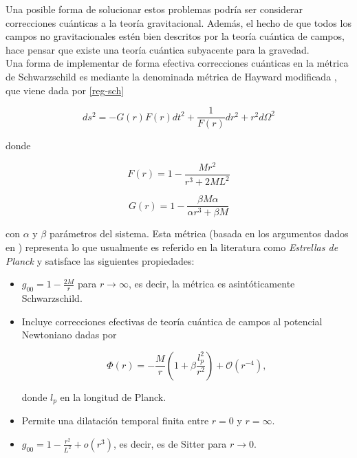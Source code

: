 \documentclass{article}
\numberwithin{equation}{section}
\begin{document}
Una posible forma de solucionar estos problemas podría ser considerar correcciones cuánticas a la teoría gravitacional. Además, el hecho de que todos los campos no gravitacionales estén bien descritos por la teoría cuántica de campos, hace pensar que existe una teoría cuántica subyacente para la gravedad.\\ 

Una forma de implementar de forma efectiva correcciones cuánticas en la métrica de Schwarzschild es mediante la denominada métrica de Hayward modificada \cite{hayward,lorenzo}, que viene dada por \eqref{reg-sch} 

\begin{equation}
\label{reg-sch}
ds^2 = -G(r)F(r) dt^2 + \frac{1}{F(r)} dr^2 + r^2d\Omega ^2
\end{equation}

donde

\begin{equation}
\label{reg-f}
F(r) = 1 - \frac{Mr^2}{r^3 + 2ML^2}
\end{equation}

\begin{equation}
\label{reg-g}
G(r) = 1 - \frac{\beta M \alpha}{\alpha r^3 + \beta M}
\end{equation}

con $\alpha$ y $\beta$ parámetros del sistema. Esta métrica (basada en los argumentos dados en \cite{hayward,bardeen}) representa lo que usualmente es referido en la literatura como \emph{Estrellas de Planck} \cite{rovelli} y  satisface las siguientes propiedades:

\begin{itemize}
\item $g_{00} = 1 - \frac{2M}{r}$ para $r \rightarrow \infty$, es decir, la m\'etrica es asint\'oticamente Schwarzschild.

\item Incluye correcciones efectivas de teoría cuántica de campos al potencial Newtoniano dadas por 

\begin{equation}
\label{new}
\Phi (r) = -\frac{M}{r} \left( 1 + \beta \frac{l_{p}^2}{r^2} \right) + \mathcal{O}(r^{-4}),
\end{equation}

donde $l_{p}$ en la longitud de Planck.
\item Permite una dilatación temporal finita entre $r = 0$ y $r = \infty$.

\item $g_{00} = 1 - \frac{r^2}{L^2} + o(r^3)$, es decir, es de Sitter para $r \rightarrow 0$.

\end{itemize}
\end{document}
